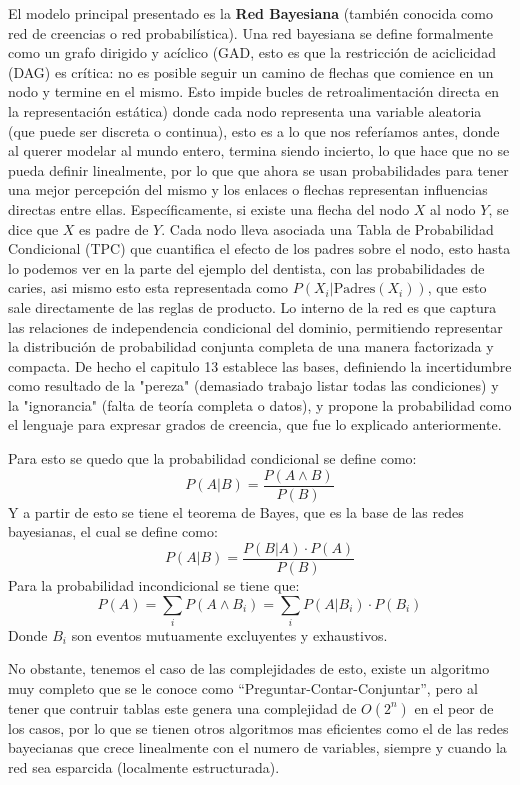 \documentclass[letterpaper,12pt]{article}
\begin{document}
El modelo principal presentado es la \textbf{Red Bayesiana} (también conocida como red de creencias o red probabilística). 
Una red bayesiana se define formalmente como un grafo dirigido y acíclico (GAD, esto es que la restricción de aciclicidad (DAG) es crítica: no es posible seguir un camino de flechas que comience en un nodo y termine en el mismo. Esto impide bucles de retroalimentación directa en la representación estática) donde cada nodo representa una variable aleatoria (que puede ser discreta o continua), esto es a lo que nos referíamos antes, donde al querer modelar al mundo entero, termina siendo incierto, lo que hace que no se pueda definir linealmente, por lo que que ahora se usan probabilidades para tener una mejor percepción del mismo y los enlaces o flechas representan influencias directas entre ellas. Específicamente, si existe una flecha del nodo $X$ al nodo $Y$, se dice que $X$ es padre de $Y$. Cada nodo lleva asociada una Tabla de Probabilidad Condicional (TPC) que cuantifica el efecto de los padres sobre el nodo, esto hasta lo podemos ver en la parte del ejemplo del dentista, con las probabilidades de caries, asi mismo esto esta representada como $P(X_i | \text{Padres}(X_i))$, que esto sale directamente de las reglas de producto.  Lo interno de la red es que captura las relaciones de independencia condicional del dominio, permitiendo representar la distribución de probabilidad conjunta completa de una manera factorizada y compacta.  De hecho el capitulo 13 establece las bases, definiendo la incertidumbre como resultado de la "pereza" (demasiado trabajo listar todas las condiciones) y la "ignorancia" (falta de teoría completa o datos), y propone la probabilidad como el lenguaje para expresar grados de creencia, que fue lo explicado anteriormente.

Para esto se quedo que la probabilidad condicional se define como: 
\[P(A|B) = \frac{P(A \land B)}{P(B)}\]
Y a partir de esto se tiene el teorema de Bayes, que es la base de las redes bayesianas, el cual se define como:
\[P(A|B) = \frac{P(B|A) \cdot P(A)}{P(B)}\]
Para la probabilidad incondicional se tiene que:
\[P(A) = \sum_{i} P(A \land B_i) = \sum_{i} P(A|B_i) \cdot P(B_i)\]
Donde $B_i$ son eventos mutuamente excluyentes y exhaustivos.

No obstante, tenemos el caso de las complejidades de esto, existe un algoritmo muy completo que se le conoce como ``Preguntar-Contar-Conjuntar'', pero al tener que contruir tablas este genera una complejidad de $O(2^n)$ en el peor de los casos, por lo que se tienen otros algoritmos mas eficientes como el de las redes bayecianas que crece linealmente con el numero de variables, siempre y cuando la red sea esparcida (localmente estructurada).
\end{document}
